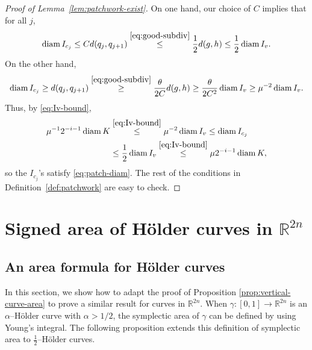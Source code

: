 \documentclass[12pt,reqno]{amsart}
\newcommand{\R}{\mathbb{R}}
\newcommand{\from}{\colon}
\theoremstyle{remark}
\newcommand{\0}{\mathbf{0}}
\renewcommand{\1}{\mathbf 1}
\DeclareMathOperator{\diam}{diam}
\begin{document}
\begin{proof}[Proof of Lemma~\ref{lem:patchwork-exist}]
  On one hand, our choice of $C$ implies that for all $j$,
  $$\diam I_{c_j} \leq C d(q_j,q_{j+1})\stackrel{\eqref{eq:good-subdiv}}{\le} \frac{1}{2} d(g,h) \le \frac{1}{2} \diam I_v.$$
  On the other hand, 
  $$\diam I_{c_j} \geq d(q_j,q_{j+1})\stackrel{\eqref{eq:good-subdiv}}{\ge} \frac{\theta}{2C} d(g,h)\geq \frac{\theta}{2C^2} \diam I_v \ge \mu^{-2} \diam I_v.$$
  Thus, by \eqref{eq:Iv-bound}, 
  \[
  \begin{aligned}
  \mu^{-1} 2^{-i-1}\diam K &\stackrel{\eqref{eq:Iv-bound}}{\le} \mu^{-2} \diam I_v \le \diam I_{c_j} \\
  &\le \frac{1}{2} \diam I_v \stackrel{\eqref{eq:Iv-bound}}{\le} \mu 2^{-i-1}\diam K,
  \end{aligned}
  \]
  so the $I_{c_j}$'s satisfy \eqref{eq:patch-diam}. The rest of the conditions in Definition~\ref{def:patchwork} are easy to check.
\end{proof}

\section{Signed area of Hölder curves in \texorpdfstring{$\R^{2n}$}{R\^{}2n}}\label{app:rn-curve-area}
\subsection{An area formula for Hölder curves}
In this section, we show how to adapt the proof of Proposition \ref{prop:vertical-curve-area} to prove a similar result for curves in $\R^{2n}$. When $\gamma\from[0,1]\to\mathbb R^{2n}$ is an $\alpha$--H\"older curve with $\alpha>1/2$, the symplectic area of $\gamma$ can be defined by using Young's integral. The following proposition extends this definition of symplectic area to $\frac{1}{2}$--Hölder curves.
\end{document}
